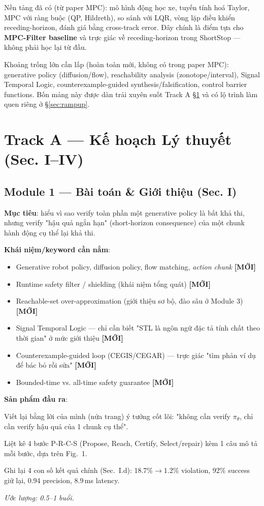 \documentclass[a4paper,12pt]{article}
\let\stdsection\section
\renewcommand{\section}{\clearpage\stdsection}
\newcommand{\new}{\textcolor{red!60!black}{\textbf{[MỚI]}}}
\begin{document}
Nền tảng đã có (từ paper MPC): mô hình động học xe, tuyến tính hoá Taylor, MPC với ràng buộc (QP, Hildreth), so sánh với LQR, vòng lặp điều khiển receding-horizon, đánh giá bằng cross-track error. Đây chính là điểm tựa cho \textbf{MPC-Filter baseline} và trực giác về receding-horizon trong ShortStop — không phải học lại từ đầu.

Khoảng trống lớn cần lấp (hoàn toàn mới, không có trong paper MPC): generative policy (diffusion/flow), reachability analysis (zonotope/interval), Signal Temporal Logic, counterexample-guided synthesis/falsification, control barrier functions. Bốn mảng này được dàn trải xuyên suốt Track A \S\ref{sec:planA} và có lộ trình làm quen riêng ở \S\ref{sec:rampup}.

\section{Track A --- Kế hoạch Lý thuyết (Sec. I--IV)}\label{sec:planA}

\subsection{Module 1 --- Bài toán \& Giới thiệu (Sec. I)}
\textbf{Mục tiêu}: hiểu vì sao verify toàn phần một generative policy là bất khả thi, nhưng verify "hậu quả ngắn hạn" (short-horizon consequence) của một chunk hành động cụ thể lại khả thi.

\textbf{Khái niệm/keyword cần nắm}:
\begin{itemize}
  \item Generative robot policy, diffusion policy, flow matching, \emph{action chunk} \new
  \item Runtime safety filter / shielding (khái niệm tổng quát) \new
  \item Reachable-set over-approximation (giới thiệu sơ bộ, đào sâu ở Module 3) \new
  \item Signal Temporal Logic — chỉ cần biết "STL là ngôn ngữ đặc tả tính chất theo thời gian" ở mức giới thiệu \new
  \item Counterexample-guided loop (CEGIS/CEGAR) — trực giác "tìm phản ví dụ để bác bỏ rồi sửa" \new
  \item Bounded-time vs. all-time safety guarantee \new
\end{itemize}

\textbf{Sản phẩm đầu ra}:
\begin{tasklist}
  \item Viết lại bằng lời của mình (nửa trang) ý tưởng cốt lõi: "không cần verify $\pi_\theta$, chỉ cần verify hậu quả của 1 chunk cụ thể".
  \item Liệt kê 4 bước P-R-C-S (Propose, Reach, Certify, Select/repair) kèm 1 câu mô tả mỗi bước, dựa trên Fig.~1.
  \item Ghi lại 4 con số kết quả chính (Sec.~I.d): 18.7\%$\to$1.2\% violation, 92\% success giữ lại, 0.94 precision, 8.9\,ms latency.
\end{tasklist}
\textit{Ước lượng: 0.5--1 buổi.}
\end{document}
